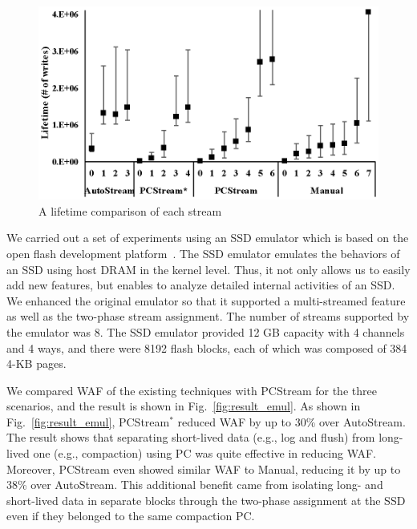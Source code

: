  \begin{figure}[b]
	\centering
	\vspace{-15pt}
	\includegraphics[width=1\linewidth]{figure/streamlifetime}
	\vspace{-20pt}
	\caption{A lifetime comparison of each stream}
	\label{fig:streamlifetime}
\end{figure}

We carried out a set of experiments using an SSD emulator which is based on the
open flash development platform~\cite{AMF}.  The SSD emulator emulates the
behaviors of an SSD using host DRAM in the kernel level. Thus, it not only
allows us to easily add new features, but enables to analyze detailed internal
activities of an SSD.  We enhanced the original emulator so that it supported a
multi-streamed feature as well as the two-phase stream assignment.  The number
of streams supported by the emulator was 8.  The SSD emulator provided 12 GB
capacity with 4 channels and 4 ways, and there were 8192 flash blocks, each of
which was composed of 384 4-KB pages.  

We compared WAF of the existing techniques with {\sf PCStream} for the three
scenarios, and the result is shown in Fig.~\ref{fig:result_emul}.  As shown in
Fig.~\ref{fig:result_emul}, {\sf PCStream$^*$} reduced WAF by up to 30\% over
\textsf{AutoStream}.  The result shows that separating short-lived data (e.g.,
log and flush) from long-lived one (e.g., compaction) using PC was quite
effective in reducing WAF.  Moreover, {\sf PCStream} even showed similar WAF to
\textsf{Manual}, reducing it by up to 38\% over \textsf{AutoStream}.  This
additional benefit came from isolating long- and short-lived data in separate
blocks through the two-phase assignment at the SSD even if they belonged to the
same compaction PC.


